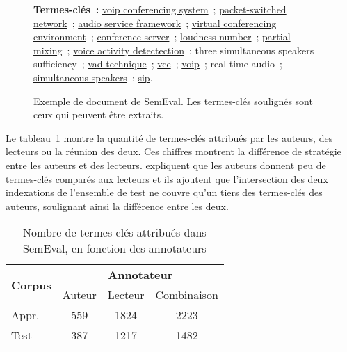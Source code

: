 \begin{figure}[!h]
{{          \textbf{Termes-clés~:} \underline{voip conferencing system}~;
          \underline{packet-switched network}~; \underline{audio service
          framework}~; \underline{virtual conferencing environment}~;
          \underline{conference server}~; \underline{loudness number}~;
          \underline{partial mixing}~; \underline{voice activity detectection}~;
          three simultaneous speakers sufficiency~; \underline{vad technique}~;
          \underline{vce}~; \underline{voip}~; real-time audio~;
          \underline{simultaneous speakers}~; \underline{sip}.
        }
      }
      \caption[Exemple de document de SemEval]{
        Exemple de document de SemEval. Les termes-clés soulignés sont ceux qui
        peuvent être extraits.
        \label{fig:example_semeval}
      }
    \end{figure}

    Le tableau~\ref{tab:semeval_annotators} montre la quantité de termes-clés
    attribués par les auteurs, des lecteurs ou la réunion des deux. Ces chiffres
    montrent la différence de stratégie entre les auteurs et des lecteurs.
     expliquent que les auteurs donnent peu de
    termes-clés comparés aux lecteurs et ils ajoutent que l'intersection des
    deux indexations de l'ensemble de test ne couvre qu'un tiers des termes-clés
    des auteurs, soulignant ainsi la différence entre les deux.

    \begin{table}[!h]
      \centering
      \begin{tabular}{l|ccc}
        \toprule
        \multirow{2}{*}{\textbf{Corpus}} & \multicolumn{3}{c}{\textbf{Annotateur}}\\
        \cline{2-4}
        & Auteur & Lecteur & Combinaison\\
        \hline
        \hfill{}Appr. & 559 & 1824 & 2223\\
        \hfill{}Test & 387 & 1217 & 1482\\
        \bottomrule
      \end{tabular}

      \caption{Nombre de termes-clés attribués dans SemEval, en fonction des
               annotateurs
               \label{tab:semeval_annotators}}
    \end{table}


